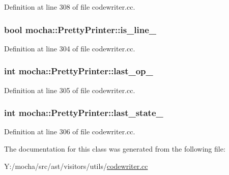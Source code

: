 Definition at line 308 of file codewriter.cc.

\hypertarget{classmocha_1_1_pretty_printer_a8708ff8166e2017244fbb396a2688ebb}{
\subsubsection[{is\_\-line\_\-}]{\setlength{\rightskip}{0pt plus 5cm}bool {\bf mocha::PrettyPrinter::is\_\-line\_\-}}}
\label{classmocha_1_1_pretty_printer_a8708ff8166e2017244fbb396a2688ebb}


Definition at line 304 of file codewriter.cc.

\hypertarget{classmocha_1_1_pretty_printer_a146a5110df5481164c5ad84a36fffe0c}{
\subsubsection[{last\_\-op\_\-}]{\setlength{\rightskip}{0pt plus 5cm}int {\bf mocha::PrettyPrinter::last\_\-op\_\-}}}
\label{classmocha_1_1_pretty_printer_a146a5110df5481164c5ad84a36fffe0c}


Definition at line 305 of file codewriter.cc.

\hypertarget{classmocha_1_1_pretty_printer_a50d07941880d3d2fc1fdf656ced16468}{
\subsubsection[{last\_\-state\_\-}]{\setlength{\rightskip}{0pt plus 5cm}int {\bf mocha::PrettyPrinter::last\_\-state\_\-}}}
\label{classmocha_1_1_pretty_printer_a50d07941880d3d2fc1fdf656ced16468}


Definition at line 306 of file codewriter.cc.



The documentation for this class was generated from the following file:\begin{DoxyCompactItemize}
\item 
Y:/mocha/src/ast/visitors/utils/\hyperlink{codewriter_8cc}{codewriter.cc}\end{DoxyCompactItemize}
